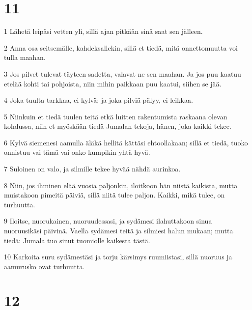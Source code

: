 \chapter{11}

\par 1 Lähetä leipäsi vetten yli, sillä ajan pitkään sinä saat sen jälleen.
\par 2 Anna osa seitsemälle, kahdeksallekin, sillä et tiedä, mitä onnettomuutta voi tulla maahan.
\par 3 Jos pilvet tulevat täyteen sadetta, valavat ne sen maahan. Ja jos puu kaatuu etelää kohti tai pohjoista, niin mihin paikkaan puu kaatui, siihen se jää.
\par 4 Joka tuulta tarkkaa, ei kylvä; ja joka pilviä pälyy, ei leikkaa.
\par 5 Niinkuin et tiedä tuulen teitä etkä luitten rakentumista raskaana olevan kohdussa, niin et myöskään tiedä Jumalan tekoja, hänen, joka kaikki tekee.
\par 6 Kylvä siemenesi aamulla äläkä hellitä kättäsi ehtoollakaan; sillä et tiedä, tuoko onnistuu vai tämä vai onko kumpikin yhtä hyvä.
\par 7 Suloinen on valo, ja silmille tekee hyvää nähdä aurinkoa.
\par 8 Niin, jos ihminen elää vuosia paljonkin, iloitkoon hän niistä kaikista, mutta muistakoon pimeitä päiviä, sillä niitä tulee paljon. Kaikki, mikä tulee, on turhuutta.
\par 9 Iloitse, nuorukainen, nuoruudessasi, ja sydämesi ilahuttakoon sinua nuoruusikäsi päivinä. Vaella sydämesi teitä ja silmiesi halun mukaan; mutta tiedä: Jumala tuo sinut tuomiolle kaikesta tästä.
\par 10 Karkoita suru sydämestäsi ja torju kärsimys ruumiistasi, sillä nuoruus ja aamurusko ovat turhuutta.

\chapter{12}

